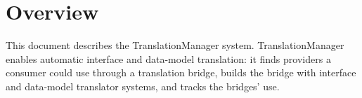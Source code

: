 \documentclass[a4paper]{arrowhead}
\begin{document}
\sloppy

\ArrowheadSetup

\begin{center}
  \vspace*{1cm}
  \huge{\arrowtitle}

  \vspace*{0.2cm}
  \LARGE{\arrowtype}
  \vspace*{1cm}

  \vspace*{\fill}


  \vspace*{1cm}
  \vspace*{\fill}

  \begin{abstract}
    This document describes the TranslationManager support system of the Eclipse Arrowhead 5.2.2 framework, as implemented in \texttt{ah5-TranslationManager-java-spring} of the primary Java source tree (\texttt{Eclipse-Arrowhead-java}) and deployed with the standalone Compose definition of that folder.
  \end{abstract}

  \vspace*{1cm}
\end{center}

\newpage

\tableofcontents
\newpage

\section{Overview}
\label{sec:overview}

This document describes the TranslationManager system. Translation\allowbreak{}Manager enables automatic interface and data-model translation: it finds providers a consumer could use through a translation bridge, builds the bridge with interface and data-model translator systems, and tracks the bridges' use.
\end{document}
